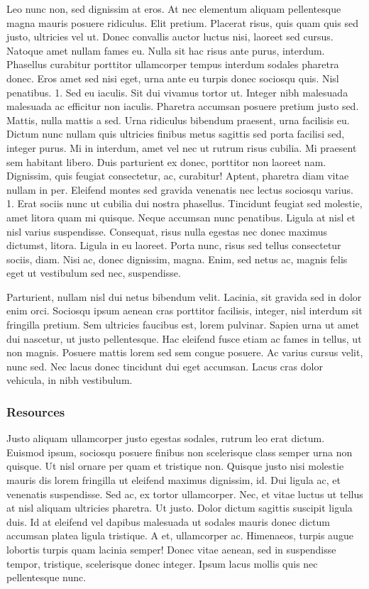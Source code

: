 \documentclass[11pt,]{article}
\begin{document}
Leo nunc non, sed dignissim at eros. At nec elementum aliquam
pellentesque magna mauris posuere ridiculus. Elit pretium. Placerat
risus, quis quam quis sed justo, ultricies vel ut. Donec convallis
auctor luctus nisi, laoreet sed cursus. Natoque amet nullam fames eu.
Nulla sit hac risus ante purus, interdum. Phasellus curabitur porttitor
ullamcorper tempus interdum sodales pharetra donec. Eros amet sed nisi
eget, urna ante eu turpis donec sociosqu quis. Nisl penatibus. 1. Sed eu
iaculis. Sit dui vivamus tortor ut. Integer nibh malesuada malesuada ac
efficitur non iaculis. Pharetra accumsan posuere pretium justo sed.
Mattis, nulla mattis a sed. Urna ridiculus bibendum praesent, urna
facilisis eu. Dictum nunc nullam quis ultricies finibus metus sagittis
sed porta facilisi sed, integer purus. Mi in interdum, amet vel nec ut
rutrum risus cubilia. Mi praesent sem habitant libero. Duis parturient
ex donec, porttitor non laoreet nam. Dignissim, quis feugiat
consectetur, ac, curabitur! Aptent, pharetra diam vitae nullam in per.
Eleifend montes sed gravida venenatis nec lectus sociosqu varius. 1.
Erat sociis nunc ut cubilia dui nostra phasellus. Tincidunt feugiat sed
molestie, amet litora quam mi quisque. Neque accumsan nunc penatibus.
Ligula at nisl et nisl varius suspendisse. Consequat, risus nulla
egestas nec donec maximus dictumst, litora. Ligula in eu laoreet. Porta
nunc, risus sed tellus consectetur sociis, diam. Nisi ac, donec
dignissim, magna. Enim, sed netus ac, magnis felis eget ut vestibulum
sed nec, suspendisse.

Parturient, nullam nisl dui netus bibendum velit. Lacinia, sit gravida
sed in dolor enim orci. Sociosqu ipsum aenean cras porttitor facilisis,
integer, nisl interdum sit fringilla pretium. Sem ultricies faucibus
est, lorem pulvinar. Sapien urna ut amet dui nascetur, ut justo
pellentesque. Hac eleifend fusce etiam ac fames in tellus, ut non
magnis. Posuere mattis lorem sed sem congue posuere. Ac varius cursus
velit, nunc sed. Nec lacus donec tincidunt dui eget accumsan. Lacus cras
dolor vehicula, in nibh vestibulum.

\hypertarget{resources}{%
\subsubsection{Resources}\label{resources}}

Justo aliquam ullamcorper justo egestas sodales, rutrum leo erat dictum.
Euismod ipsum, sociosqu posuere finibus non scelerisque class semper
urna non quisque. Ut nisl ornare per quam et tristique non. Quisque
justo nisi molestie mauris dis lorem fringilla ut eleifend maximus
dignissim, id. Dui ligula ac, et venenatis suspendisse. Sed ac, ex
tortor ullamcorper. Nec, et vitae luctus ut tellus at nisl aliquam
ultricies pharetra. Ut justo. Dolor dictum sagittis suscipit ligula
duis. Id at eleifend vel dapibus malesuada ut sodales mauris donec
dictum accumsan platea ligula tristique. A et, ullamcorper ac.
Himenaeos, turpis augue lobortis turpis quam lacinia semper! Donec vitae
aenean, sed in suspendisse tempor, tristique, scelerisque donec integer.
Ipsum lacus mollis quis nec pellentesque nunc.
\end{document}
